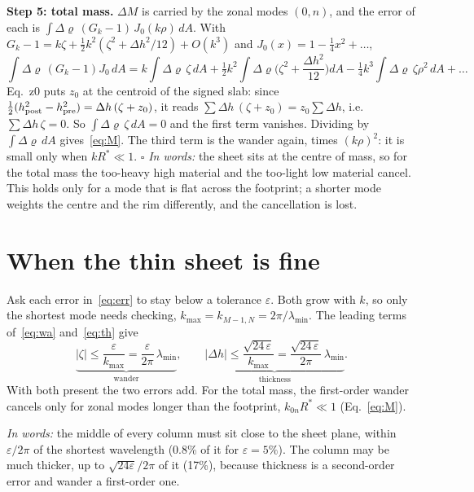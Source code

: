 \documentclass[11pt]{article}
\newcommand{\D}[1]{\textsf{#1}}   %
\newcommand{\words}[1]{\emph{In words:} #1}
\begin{document}
\textbf{Step 5: total mass.} $\Delta M$ is carried by the zonal modes $(0,n)$,
and the error of each is
$\int\Delta\varrho\,(G_k-1)\,J_0(k\rho)\,dA$. With
$G_k-1=k\zeta+\tfrac12k^2(\zeta^2+\Delta h^2/12)+O(k^3)$ and
$J_0(x)=1-\tfrac14x^2+\dots$,
\begin{equation}
  \int\Delta\varrho\,(G_k-1)J_0\,dA
  =k\!\int\!\Delta\varrho\,\zeta\,dA
  +\tfrac12k^2\!\int\!\Delta\varrho\Big(\zeta^2+\frac{\Delta h^2}{12}\Big)dA
  -\tfrac14k^3\!\int\!\Delta\varrho\,\zeta\rho^2\,dA+\dots
\end{equation}
Eq.~\D{z0} puts $z_0$ at the centroid of the signed slab: since
$\tfrac12(h_{\rm post}^2-h_{\rm pre}^2)=\Delta h\,(\zeta+z_0)$, it reads
$\sum\Delta h\,(\zeta+z_0)=z_0\sum\Delta h$, i.e.\ $\sum\Delta h\,\zeta=0$. So
$\int\Delta\varrho\,\zeta\,dA=0$ and the first term vanishes. Dividing by
$\int\Delta\varrho\,dA$ gives~\eqref{eq:M}. The third term is the wander again,
times $(k\rho)^2$: it is small only when $kR^*\ll1$. \hfill$\square$
\words{the sheet sits at the centre of mass, so for the total mass the
too-heavy high material and the too-light low material cancel. This holds only
for a mode that is flat across the footprint; a shorter mode weights the
centre and the rim differently, and the cancellation is lost.}

\section*{When the thin sheet is fine}
Ask each error in~\eqref{eq:err} to stay below a tolerance $\varepsilon$. Both
grow with $k$, so only the shortest mode needs checking,
$k_{\max}=k_{M-1,N}=2\pi/\lambda_{\min}$. The leading terms of~\eqref{eq:wa}
and~\eqref{eq:th} give
\begin{equation}
  \boxed{\;
  \underbrace{|\zeta|\le\frac{\varepsilon}{k_{\max}}=\frac{\varepsilon}{2\pi}\,\lambda_{\min}}_{\text{wander}},
  \qquad
  \underbrace{|\Delta h|\le\frac{\sqrt{24\,\varepsilon}}{k_{\max}}=\frac{\sqrt{24\,\varepsilon}}{2\pi}\,\lambda_{\min}}_{\text{thickness}}.\;}
  \label{eq:bound}
\end{equation}
With both present the two errors add. For the total mass, the first-order wander
cancels only for zonal modes longer than the footprint, $k_{0n}R^*\ll1$
(Eq.~\eqref{eq:M}).

\words{the middle of every column must sit close to the sheet plane, within
$\varepsilon/2\pi$ of the shortest wavelength (0.8\% of it for $\varepsilon=5\%$).
The column may be much thicker, up to $\sqrt{24\varepsilon}/2\pi$ of it (17\%),
because thickness is a second-order error and wander a first-order one.}
\end{document}
